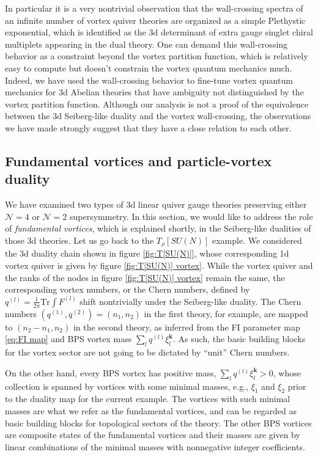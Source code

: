 \documentclass[a4paper,11pt]{article}
\begin{document}
In particular it is a very nontrivial observation that the wall-crossing spectra of an infinite number of vortex quiver theories are organized as a simple Plethystic exponential, which is identified as the 3d determinant of extra gauge singlet chiral multiplets appearing in the dual theory. One can demand this wall-crossing behavior as a constraint beyond the vortex partition function, which is relatively easy to compute but doesn't constrain the vortex quantum mechanics much. Indeed, we have used the wall-crossing behavior to fine-tune vortex quantum mechanics for 3d Abelian theories that have ambiguity not distinguished by the vortex partition function. Although our analysis is not a proof of the equivalence between the 3d Seiberg-like duality and the vortex wall-crossing, the observations we have made strongly suggest that they have a close relation to each other.
\\





\subsection{Fundamental vortices and particle-vortex duality}

We have examined two types of 3d linear quiver gauge theories preserving either $\mathcal N = 4$ or $\mathcal N = 2$ supersymmetry. In this section, we would like to address the role of \emph{fundamental vortices}, which is explained shortly, in the Seiberg-like dualities of those 3d theories. Let us go back to the $T_\rho [SU(N)]$ example. We considered the 3d duality chain shown in figure \ref{fig:T[SU(N)]}, whose corresponding 1d vortex quiver is given by figure \ref{fig:T[SU(N)] vortex}. While the vortex quiver and the ranks of the nodes in figure \ref{fig:T[SU(N)] vortex} remain the same, the corresponding vortex numbers, or the Chern numbers, defined by $q^{(l)} = \frac{1}{2 \pi} \mathrm{Tr} \int F^{(l)}$ shift nontrivially under the Seiberg-like duality. The Chern numbers $(q^{(1)},q^{(2)}) = (n_1,n_2)$ in the first theory, for example, are mapped to $(n_2-n_1,n_2)$ in the second theory, as inferred from the FI parameter map \eqref{eq:FI map} and BPS vortex mass $\sum_l q^{(l)} \xi_l^{\mathbf k}$. As such, the basic building blocks for the vortex sector are not going to be dictated by ``unit'' Chern numbers.

On the other hand, every BPS vortex has positive mass, $\sum_l q^{(l)} \xi_l^{\mathbf k} > 0$, whose collection is spanned by vortices with some minimal masses, e.g., $\xi_1$ and $\xi_2$ prior to the duality map for the current example. The vortices with
such minimal masses are what we refer as the fundamental vortices, and can be regarded as basic building blocks for topological sectors of the theory. The other BPS vortices are composite states of the fundamental vortices and their masses are given by linear combinations of the minimal masses with nonnegative integer coefficients.
\end{document}
